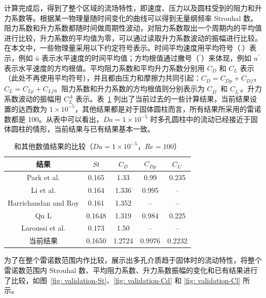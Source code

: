 计算完成后，得到了整个区域的流场特性，即速度、压力以及圆柱受到的阻力和升力系数等。根据某一物理量随时间变化的曲线可以得到无量纲频率 Strouhal 数。阻力系数和升力系数都随时间做周期性波动，对阻力系数取出一个周期内的平均值进行比较，升力系数的平均值为零，可以通过读取升力系数波动的振幅进行比较。在本文中，一些物理量采用以下约定符号表示。时间平均速度用平均符号（$\bar{ }$）表示，例如 $\bar u$ 表示水平速度的时间平均值；方均根值通过撇号（$^\prime$）来体现，例如 $u^\prime$ 表示水平速度的方均根值。平均阻力系数和平均升力系数分别用 $C_D$ 和 $C_L$ 表示（此处不再使用平均符号），并且都由压力和摩擦力共同引起：$C_D=C_{Dp}+C_{Df}$，$C_L=C_{Lp}+C_{Lf}$。阻力系数和升力系数的方均根值则分别表示为 $C_{D^\prime}$ 和 $C_{L^\prime}$。升力系数波动的振幅用 $C_L^A$ 表示。表~\ref{tab: validation} 列出了当前过去的一些计算结果，当前结果设置的达西数为 $1\times 10^{-5}$，其他结果都是对于固体圆柱而言，所有结果所采用的雷诺数都是 100。从表中可以看出，$Da=1\times 10^{-5}$ 时多孔圆柱中的流动已经接近于固体圆柱的情形，当前结果与已有结果基本一致。

\begin{table}[ht]
	\caption{和其他数值结果的比较（$Da=1\times 10^{-5}$，$Re=100$）}
	\label{tab: validation}
	\vspace{.5em}\centering\wuhao
	\begin{tabular}{*{5}{c}}
		\toprule[1.5pt]
		结果 & $St$ & $C_D$ & $C_{Dp}$ & $C_{L'}$ \\
		\midrule[1pt]
		Park et al. \inlinecite{Park1998} & 0.165 & 1.33 & 0.99 & 0.235 \\
		Li et al. \inlinecite{Li2009} & 0.164 & 1.336 & 0.995 & -- \\
		Harrichandan and Roy \inlinecite{Harichandan2010} & 0.161 & 1.352 & -- & -- \\
		Qu L \inlinecite{Qu2013} & 0.1648 & 1.319 & 0.984 & 0.225 \\
		Laroussi et al. \inlinecite{Laroussi2014} & 0.173 & 1.50 & -- & -- \\
		当前结果 & 0.1650 & 1.2724 & 0.9976 & 0.2232 \\
		\bottomrule[1.5pt]
	\end{tabular}
\end{table}


为了在整个雷诺数范围内作比较，展示出多孔介质趋于固体时的流动特性，将整个雷诺数范围内 Strouhal 数、平均阻力系数、升力系数振幅的变化和已有结果进行了比较，如图~\ref{fig: validation-St}、\ref{fig: validation-Cd} 和 \ref{fig: validation-Cl} 所示。

